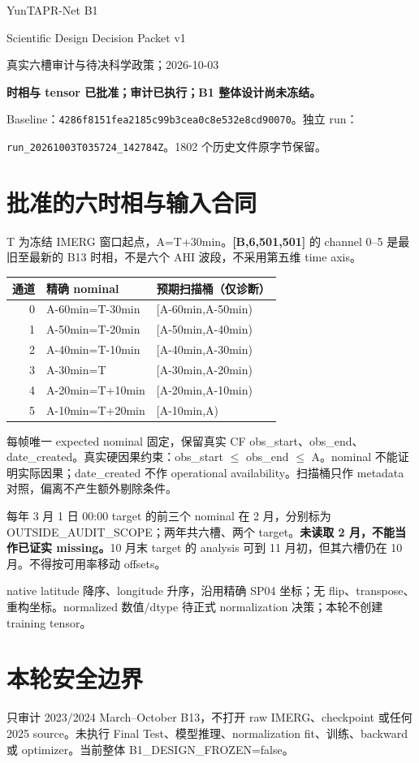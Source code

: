 \documentclass[UTF8,11pt,a4paper,fontset=windows]{ctexart}
\begin{document}
\begin{center}{\LARGE YunTAPR-Net B1}\par{\Large Scientific Design Decision Packet v1}\par 真实六槽审计与待决科学政策；2026-10-03\end{center}
\textbf{时相与 tensor 已批准；审计已执行；B1 整体设计尚未冻结。}

Baseline：\texttt{4286f8151fea2185c99b3cea0c8e532e8cd90070}。独立 run：\par
\texttt{run\_20261003T035724\_142784Z}。1802 个历史文件原字节保留。

\section*{批准的六时相与输入合同}
T 为冻结 IMERG 窗口起点，A=T+30min。\textbf{[B,6,501,501]} 的 channel 0--5 是最旧至最新的 B13 时相，不是六个 AHI 波段，不采用第五维 time axis。
\begin{center}\begin{tabular}{rll}\toprule 通道 & 精确 nominal & 预期扫描桶（仅诊断）\\\midrule
0 & A-60min=T-30min & [A-60min,A-50min)\\
1 & A-50min=T-20min & [A-50min,A-40min)\\
2 & A-40min=T-10min & [A-40min,A-30min)\\
3 & A-30min=T & [A-30min,A-20min)\\
4 & A-20min=T+10min & [A-20min,A-10min)\\
5 & A-10min=T+20min & [A-10min,A)\\\bottomrule\end{tabular}\end{center}
每帧唯一 expected nominal 固定，保留真实 CF obs\_start、obs\_end、date\_created。真实硬因果约束：obs\_start $\leq$ obs\_end $\leq$ A。nominal 不能证明实际因果；date\_created 不作 operational availability。扫描桶只作 metadata 对照，偏离不产生额外剔除条件。

每年 3 月 1 日 00:00 target 的前三个 nominal 在 2 月，分别标为 OUTSIDE\_AUDIT\_SCOPE；两年共六槽、两个 target。\textbf{未读取 2 月，不能当作已证实 missing。}10 月末 target 的 analysis 可到 11 月初，但其六槽仍在 10 月。不得按可用率移动 offsets。

native latitude 降序、longitude 升序，沿用精确 SP04 坐标；无 flip、transpose、重构坐标。normalized 数值/dtype 待正式 normalization 决策；本轮不创建 training tensor。

\section*{本轮安全边界}
只审计 2023/2024 March--October B13，不打开 raw IMERG、checkpoint 或任何 2025 source。未执行 Final Test、模型推理、normalization fit、训练、backward 或 optimizer。当前整体 B1\_DESIGN\_FROZEN=false。
\newpage
\end{document}
